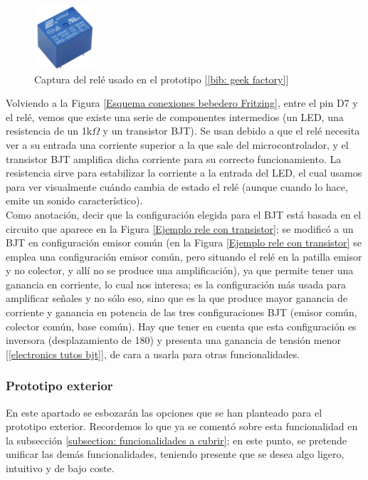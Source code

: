 \documentclass[12pt]{article}
\begin{document}
	\begin{figure}[h]
		\begin{center}
			\includegraphics[width=0.2\textwidth]{img/rele.png}
			\caption{Captura del relé usado en el prototipo [\ref{bib: geek factory}]}
			\label{Captura relé}
		\end{center}
	\end{figure}

	\noindent Volviendo a la Figura \ref{Esquema conexiones bebedero Fritzing}, entre el pin D7 y el relé, vemos que existe una serie de componentes intermedios (un LED, una resistencia de un 1k$\Omega$ y un transistor BJT). Se usan debido a que el relé necesita ver a su entrada una corriente superior a la que sale del microcontrolador, y el transistor BJT amplifica dicha corriente para su correcto funcionamiento. La resistencia sirve para estabilizar la corriente a la entrada del LED, el cual usamos para ver visualmente cuándo cambia de estado el relé (aunque cuando lo hace, emite un sonido característico). \\
	
	\noindent Como anotación, decir que la configuración elegida para el BJT está basada en el circuito que aparece en la Figura \ref{Ejemplo rele con transistor}; se modificó a un BJT en configuración emisor común (en la Figura \ref{Ejemplo rele con transistor} se emplea una configuración emisor común, pero situando el relé en la patilla emisor y no colector, y allí no se produce una amplificación), ya que permite tener una ganancia en corriente, lo cual nos interesa; es la configuración más usada para amplificar señales y no sólo eso, sino que es la que produce mayor ganancia de corriente y ganancia en potencia de las tres configuraciones BJT (emisor común, colector común, base común). Hay que tener en cuenta que esta configuración es inversora (desplazamiento de 180\degree) y presenta una ganancia de tensión menor [\ref{electronics tutos bjt}], de cara a usarla para otras funcionalidades.  
	
	\pagebreak
	
	\subsubsection{Prototipo exterior}
	\label{subsubsection: prototipo exterior}
	\noindent En este apartado se esbozarán las opciones que se han planteado para el prototipo exterior. Recordemos lo que ya se comentó sobre esta funcionalidad en la subsección \ref{subsection: funcionalidades a cubrir}; en este punto, se pretende unificar las demás funcionalidades, teniendo presente que se desea algo ligero, intuitivo y de bajo coste. \\
	
\end{document}
